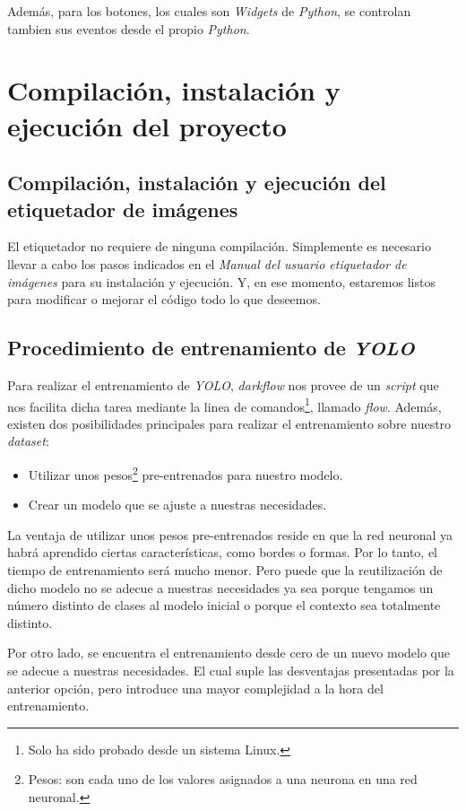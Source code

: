 Además, para los botones, los cuales son \textit{Widgets} de \textit{Python}, se controlan tambien sus eventos desde el propio \textit{Python}.

\section{Compilación, instalación y ejecución del proyecto}

\subsection{Compilación, instalación y ejecución del  etiquetador de imágenes}
El etiquetador no requiere de ninguna compilación. Simplemente es necesario llevar a cabo los pasos indicados en el \textit{\textit{Manual del usuario etiquetador de imágenes}} para su instalación y ejecución. Y, en ese momento, estaremos listos para modificar o mejorar el código todo lo que deseemos.

\subsection{Procedimiento de entrenamiento de \textit{YOLO}}

Para realizar el entrenamiento de \textit{YOLO}, \textit{darkflow} nos provee de un \textit{script} que nos facilita dicha tarea mediante la linea de comandos\footnote{Solo ha sido probado desde un sistema Linux.}, llamado \textit{flow}. Además, existen dos posibilidades principales para realizar el entrenamiento sobre nuestro \textit{dataset}:

\begin{itemize}
	\item Utilizar unos pesos\footnote{Pesos: son cada uno de los valores asignados a una neurona en una red neuronal.} pre-entrenados para nuestro modelo.
	\item Crear un modelo que se ajuste a nuestras necesidades.
\end{itemize}

La ventaja de utilizar unos pesos pre-entrenados reside en que la red neuronal ya habrá aprendido ciertas características, como bordes o formas. Por lo tanto, el tiempo de entrenamiento será mucho menor. Pero puede que la reutilización de dicho modelo no se adecue a nuestras necesidades ya sea porque tengamos un número distinto de clases al modelo inicial o porque el contexto sea totalmente distinto.

Por otro lado, se encuentra el entrenamiento desde cero de un nuevo modelo que se adecue a nuestras necesidades. El cual suple las desventajas presentadas por la anterior opción, pero introduce una mayor complejidad a la hora del entrenamiento.


